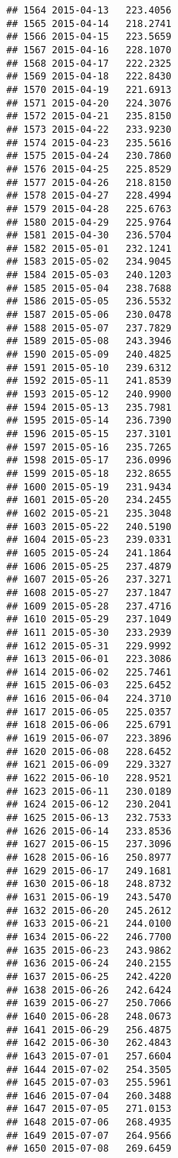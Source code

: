 \documentclass[
]{article}
\begin{document}
\begin{verbatim}
## 1564 2015-04-13   223.4056
## 1565 2015-04-14   218.2741
## 1566 2015-04-15   223.5659
## 1567 2015-04-16   228.1070
## 1568 2015-04-17   222.2325
## 1569 2015-04-18   222.8430
## 1570 2015-04-19   221.6913
## 1571 2015-04-20   224.3076
## 1572 2015-04-21   235.8150
## 1573 2015-04-22   233.9230
## 1574 2015-04-23   235.5616
## 1575 2015-04-24   230.7860
## 1576 2015-04-25   225.8529
## 1577 2015-04-26   218.8150
## 1578 2015-04-27   228.4994
## 1579 2015-04-28   225.6763
## 1580 2015-04-29   225.9764
## 1581 2015-04-30   236.5704
## 1582 2015-05-01   232.1241
## 1583 2015-05-02   234.9045
## 1584 2015-05-03   240.1203
## 1585 2015-05-04   238.7688
## 1586 2015-05-05   236.5532
## 1587 2015-05-06   230.0478
## 1588 2015-05-07   237.7829
## 1589 2015-05-08   243.3946
## 1590 2015-05-09   240.4825
## 1591 2015-05-10   239.6312
## 1592 2015-05-11   241.8539
## 1593 2015-05-12   240.9900
## 1594 2015-05-13   235.7981
## 1595 2015-05-14   236.7390
## 1596 2015-05-15   237.3101
## 1597 2015-05-16   235.7265
## 1598 2015-05-17   236.0996
## 1599 2015-05-18   232.8655
## 1600 2015-05-19   231.9434
## 1601 2015-05-20   234.2455
## 1602 2015-05-21   235.3048
## 1603 2015-05-22   240.5190
## 1604 2015-05-23   239.0331
## 1605 2015-05-24   241.1864
## 1606 2015-05-25   237.4879
## 1607 2015-05-26   237.3271
## 1608 2015-05-27   237.1847
## 1609 2015-05-28   237.4716
## 1610 2015-05-29   237.1049
## 1611 2015-05-30   233.2939
## 1612 2015-05-31   229.9992
## 1613 2015-06-01   223.3086
## 1614 2015-06-02   225.7461
## 1615 2015-06-03   225.6452
## 1616 2015-06-04   224.3710
## 1617 2015-06-05   225.0357
## 1618 2015-06-06   225.6791
## 1619 2015-06-07   223.3896
## 1620 2015-06-08   228.6452
## 1621 2015-06-09   229.3327
## 1622 2015-06-10   228.9521
## 1623 2015-06-11   230.0189
## 1624 2015-06-12   230.2041
## 1625 2015-06-13   232.7533
## 1626 2015-06-14   233.8536
## 1627 2015-06-15   237.3096
## 1628 2015-06-16   250.8977
## 1629 2015-06-17   249.1681
## 1630 2015-06-18   248.8732
## 1631 2015-06-19   243.5470
## 1632 2015-06-20   245.2612
## 1633 2015-06-21   244.0100
## 1634 2015-06-22   246.7700
## 1635 2015-06-23   243.9862
## 1636 2015-06-24   240.2155
## 1637 2015-06-25   242.4220
## 1638 2015-06-26   242.6424
## 1639 2015-06-27   250.7066
## 1640 2015-06-28   248.0673
## 1641 2015-06-29   256.4875
## 1642 2015-06-30   262.4843
## 1643 2015-07-01   257.6604
## 1644 2015-07-02   254.3505
## 1645 2015-07-03   255.5961
## 1646 2015-07-04   260.3488
## 1647 2015-07-05   271.0153
## 1648 2015-07-06   268.4935
## 1649 2015-07-07   264.9566
## 1650 2015-07-08   269.6459

\end{verbatim}
\end{document}
